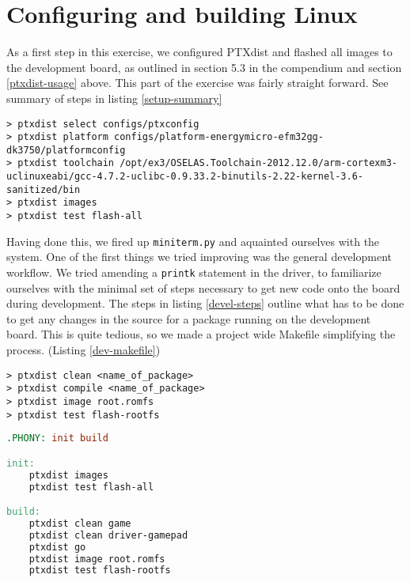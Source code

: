 \section{Configuring and building Linux}

As a first step in this exercise, we configured PTXdist and flashed all images to the development board, as outlined in section 5.3 in the compendium \cite[p.~47]{compendium} and section \ref{ptxdist-usage} above. This part of the exercise was fairly straight forward. See summary of steps in listing \ref{setup-summary}

\begin{lstlisting}[label=setup-summary, caption=Setup summary]
> ptxdist select configs/ptxconfig
> ptxdist platform configs/platform-energymicro-efm32gg-dk3750/platformconfig
> ptxdist toolchain /opt/ex3/OSELAS.Toolchain-2012.12.0/arm-cortexm3-uclinuxeabi/gcc-4.7.2-uclibc-0.9.33.2-binutils-2.22-kernel-3.6-sanitized/bin
> ptxdist images
> ptxdist test flash-all
\end{lstlisting}

Having done this, we fired up \texttt{miniterm.py} and aquainted ourselves with the system. One of the first things we tried improving was the general development workflow. 
We tried amending a \texttt{printk} statement in the driver, to familiarize ourselves with the minimal set of steps necessary to get new code onto the board during development. 
The steps in listing \ref{devel-steps} outline what has to be done to get any changes in the source for a package running on the development board. This is quite tedious, so we made a project wide Makefile simplifying the process. (Listing \ref{dev-makefile})

\begin{lstlisting}[label=devel-steps, caption=Development steps]
> ptxdist clean <name_of_package>
> ptxdist compile <name_of_package>
> ptxdist image root.romfs
> ptxdist test flash-rootfs
\end{lstlisting}

\begin{lstlisting}[language=make, label=dev-makefile, caption=Development Makefile]
.PHONY: init build

init:
    ptxdist images
    ptxdist test flash-all

build:
    ptxdist clean game
    ptxdist clean driver-gamepad
    ptxdist go
    ptxdist image root.romfs
    ptxdist test flash-rootfs
\end{lstlisting}
